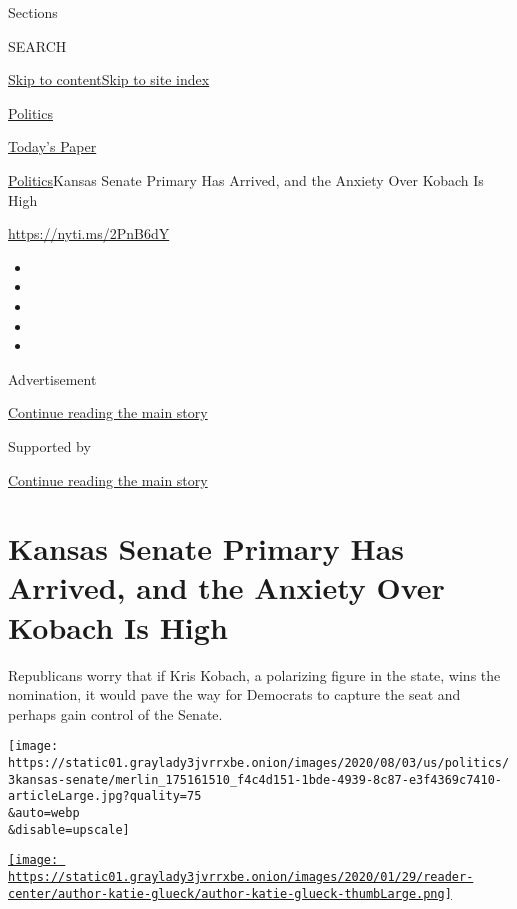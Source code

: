 Sections

SEARCH

\protect\hyperlink{site-content}{Skip to
content}\protect\hyperlink{site-index}{Skip to site index}

\href{https://www.nytimes3xbfgragh.onion/section/politics}{Politics}

\href{https://myaccount.nytimes3xbfgragh.onion/auth/login?response_type=cookie\&client_id=vi}{}

\href{https://www.nytimes3xbfgragh.onion/section/todayspaper}{Today's
Paper}

\href{/section/politics}{Politics}\textbar{}Kansas Senate Primary Has
Arrived, and the Anxiety Over Kobach Is High

\url{https://nyti.ms/2PnB6dY}

\begin{itemize}
\item
\item
\item
\item
\item
\end{itemize}

Advertisement

\protect\hyperlink{after-top}{Continue reading the main story}

Supported by

\protect\hyperlink{after-sponsor}{Continue reading the main story}

\hypertarget{kansas-senate-primary-has-arrived-and-the-anxiety-over-kobach-is-high}{%
\section{Kansas Senate Primary Has Arrived, and the Anxiety Over Kobach
Is
High}\label{kansas-senate-primary-has-arrived-and-the-anxiety-over-kobach-is-high}}

Republicans worry that if Kris Kobach, a polarizing figure in the state,
wins the nomination, it would pave the way for Democrats to capture the
seat and perhaps gain control of the Senate.

\texttt{[image: https://static01.graylady3jvrrxbe.onion/images/2020/08/03/us/politics/3kansas-senate/merlin\_175161510\_f4c4d151-1bde-4939-8c87-e3f4369c7410-articleLarge.jpg?quality=75\\\&auto=webp\\\&disable=upscale]}

\href{https://www.nytimes3xbfgragh.onion/by/katie-glueck}{\texttt{[image: https://static01.graylady3jvrrxbe.onion/images/2020/01/29/reader-center/author-katie-glueck/author-katie-glueck-thumbLarge.png]}}

